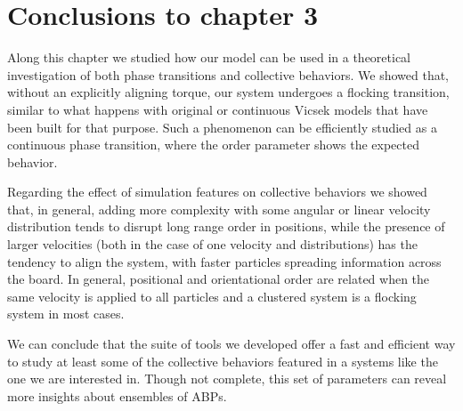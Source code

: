 \documentclass[../../master_thesis_np.tex]{subfiles}
\begin{document}
    \section{Conclusions to chapter 3}
    Along this chapter we studied how our model can be used in a theoretical investigation of both phase transitions and collective behaviors.
    We showed that, without an explicitly aligning torque, our system undergoes a flocking transition, similar to what happens with original or continuous Vicsek models that have been built for that purpose.
    Such a phenomenon can be efficiently studied as a continuous phase transition, where the order parameter shows the expected behavior.
    
    Regarding the effect of simulation features on collective behaviors we showed that, in general, adding more complexity with some angular or linear velocity distribution tends to disrupt long range order in positions, while the presence of larger velocities (both in the case of one velocity and distributions) has the tendency to align the system, with faster particles spreading information across the board.
    In general, positional and orientational order are related when the same velocity is applied to all particles and a clustered system is a flocking system in most cases.
    
    We can conclude that the suite of tools we developed offer a fast and efficient way to study at least some of the collective behaviors featured in a systems like the one we are interested in.
    Though not complete, this set of parameters can reveal more insights about ensembles of ABPs.
    
\end{document}

